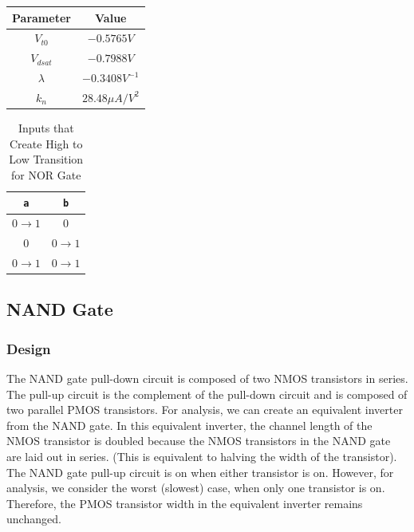 \documentclass[fleqn]{article}
\begin{document}
	\begin{center}
	\begin{tabular}{| c | c |}
		\hline
		Parameter & Value \\
		\hline	
		$V_{t0}$ & $-0.5765 V$\\
		\hline	
		$V_{dsat}$ & $-0.7988 V$\\
		\hline	
		$\lambda$ & $-0.3408 V^{-1}$\\
		\hline			
		$k_n$ & $28.48 {\mu}A/V^2$ \\
		\hline
	\end{tabular}
	\end{center}
	
	\begin{table}
	\begin{center}
	\caption{Inputs that Create High to Low Transition for NOR Gate}
	\begin{tabular}{| c | c |}
		\hline
		\texttt{a} & \texttt{b} \\
		\hline	
		$0 \rightarrow 1$ & $0$\\
		\hline	
		$0$ & $0 \rightarrow 1$\\
		\hline	
		$0 \rightarrow 1$ & $0 \rightarrow 1$\\
		\hline
	\end{tabular}
	\end{center}
	\end{table}
	
	\subsection{NAND Gate}
	
	\subsubsection{Design}
	
	The NAND gate pull-down circuit is composed of two NMOS transistors in series. The pull-up circuit is the complement of the pull-down circuit and is composed of two parallel PMOS transistors. For analysis, we can create an equivalent inverter from the NAND gate. In this equivalent inverter, the channel length of the NMOS transistor is doubled because the NMOS transistors in the NAND gate are laid out in series. (This is equivalent to halving the width of the transistor). The NAND gate pull-up circuit is on when either transistor is on. However, for analysis, we consider the worst (slowest) case, when only one transistor is on. Therefore, the PMOS transistor width in the equivalent inverter remains unchanged.
	
\end{document}
